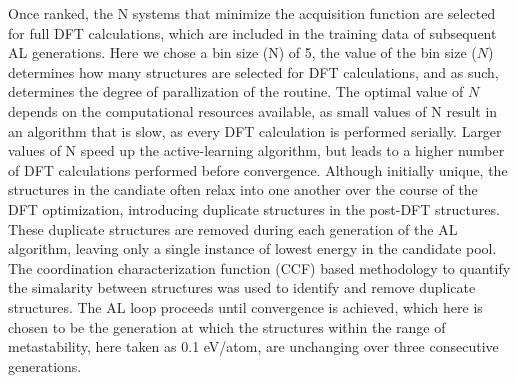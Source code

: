 Once ranked, the N systems that minimize the acquisition function are selected for full DFT calculations, which are included in the training data of subsequent AL generations.
%
Here we chose a bin size (N) of 5, the value of the bin size ($N$) determines how many structures are selected for DFT calculations,
and as such, determines the degree of parallization of the routine.
%
The optimal value of $N$ depends on the computational resources available, as small values of N result in an algorithm that is slow, as every DFT calculation is performed serially.
%
Larger values of N speed up the active-learning algorithm, but leads to a higher number of DFT calculations performed before convergence.
%
Although initially unique, the structures in the candiate often relax into one another over the course of the DFT optimization, introducing duplicate structures in the post-DFT structures.
%
These duplicate structures are removed during each generation of the AL algorithm, leaving only a single instance of lowest energy in the candidate pool.
%
The coordination characterization function (CCF) based methodology to quantify the simalarity between structures was used to identify and remove duplicate structures.\cite{Su2017}
%
The AL loop proceeds until convergence is achieved, which here is chosen to be the generation at which the structures within the range of metastability, here taken as 0.1 eV/atom, are unchanging over three consecutive generations.



